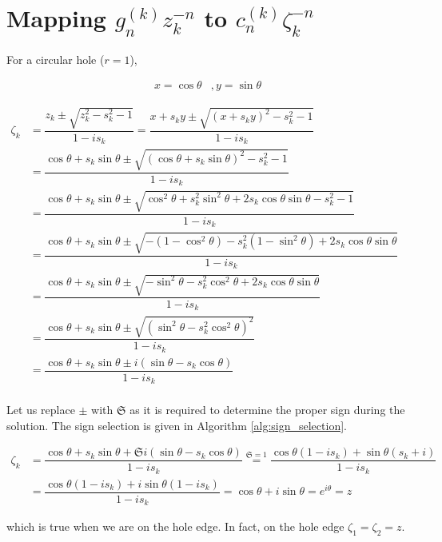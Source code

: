 \section{Mapping \texorpdfstring{$g_n^{(k)} z_k^{-n}$}{} to \texorpdfstring{$c_n^{(k)} \zeta_k^{-n}$}{}} \label{app:mapping}

For a circular hole ($r=1$),

\begin{equation*}
    \begin{matrix}
    x = \cos\theta & , 
    y = \sin\theta
    \end{matrix}
\end{equation*}

\begin{align*}
    \zeta_k & = \dfrac{z_k \pm \sqrt{z_k^2 - s_k^2 - 1}}{1-is_k} = \dfrac{x + s_k y \pm \sqrt{(x + s_k y)^2 - s_k^2 - 1}}{1-is_k} & \\
    &= \dfrac{\cos\theta + s_k \sin\theta \pm \sqrt{(\cos\theta + s_k \sin\theta)^2 - s_k^2 -1}}{1 - i s_k} & \\
    & = \dfrac{\cos\theta + s_k \sin\theta \pm \sqrt{\cos^2\theta + s_k^2 \sin^2\theta + 2s_k\cos\theta \sin\theta - s_k^2 -1}}{1 - i s_k}  & \\
    & = \dfrac{\cos\theta + s_k \sin\theta \pm \sqrt{-(1 - \cos^2\theta) - s_k^2 (1- \sin^2\theta) + 2s_k\cos\theta \sin\theta}}{1 - i s_k}  & \\
    & = \dfrac{\cos\theta + s_k \sin\theta \pm \sqrt{-\sin^2\theta - s_k^2 \cos^2\theta + 2s_k\cos\theta \sin\theta}}{1 - i s_k}  & \\
    & = \dfrac{\cos\theta + s_k \sin\theta \pm \sqrt{(\sin^2\theta - s_k^2 \cos^2\theta)^2}}{1 - i s_k}  & \\
    & = \dfrac{\cos\theta + s_k \sin\theta \pm i(\sin\theta - s_k \cos\theta)}{1 - i s_k}  & \\
\end{align*}

Let us replace $\pm$ with $\mathfrak{S}$ as it is required to determine the proper sign during the solution. The sign selection is given in Algorithm \ref{alg:sign_selection}.

\begin{align*}
    \zeta_k & = \dfrac{\cos\theta + s_k \sin\theta + \mathfrak{S} i(\sin\theta - s_k \cos\theta)}{1 - i s_k} \overset{\mathfrak{S}=1}{=} \dfrac{\cos\theta(1-i s_k) + \sin\theta (s_k+i)}{1 - i s_k} & \\
    & = \dfrac{\cos\theta(1-i s_k) + i \sin\theta (1 - i s_k)}{1 - i s_k} = \cos\theta + i\sin\theta = e^{i\theta} = z  &
\end{align*}

which is true when we are on the hole edge. In fact, on the hole edge $\zeta_1 = \zeta_2 = z$.